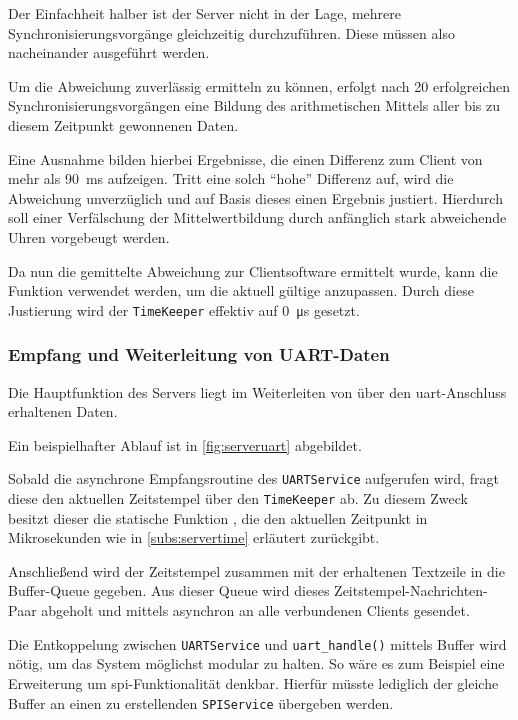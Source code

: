 Der Einfachheit halber ist der Server nicht in der Lage, mehrere
Synchronisierungsvorgänge gleichzeitig durchzuführen. Diese müssen also
nacheinander ausgeführt werden.

Um die Abweichung zuverlässig ermitteln zu können, erfolgt nach 20
erfolgreichen Synchronisierungsvorgängen eine Bildung des arithmetischen Mittels
aller bis zu diesem Zeitpunkt gewonnenen Daten. 

Eine Ausnahme bilden hierbei Ergebnisse, die einen Differenz zum Client von mehr
als \SI{90}{\ms} aufzeigen. Tritt eine solch "`hohe"' Differenz auf, wird die
Abweichung unverzüglich und auf Basis dieses einen Ergebnis justiert. Hierdurch
soll einer Verfälschung der Mittelwertbildung durch anfänglich stark
abweichende Uhren vorgebeugt werden.

Da nun die gemittelte Abweichung zur Clientsoftware ermittelt wurde, kann die
Funktion \newline{} verwendet
werden, um die aktuell gültige  anzupassen. Durch diese
Justierung wird der \texttt{TimeKeeper} effektiv auf \SI{0}{\micro\second}
gesetzt.

\subsubsection*{Empfang und Weiterleitung von UART-Daten}
Die Hauptfunktion des Servers liegt im Weiterleiten von über den
\gls{uart}-Anschluss erhaltenen Daten.

Ein beispielhafter Ablauf ist in \autoref{fig:serveruart} abgebildet.

Sobald die asynchrone Empfangsroutine des \texttt{UARTService} aufgerufen wird,
fragt diese den aktuellen Zeitstempel über den \texttt{TimeKeeper} ab. Zu
diesem Zweck besitzt dieser die statische Funktion , die den
aktuellen Zeitpunkt in Mikrosekunden wie in \autoref{subs:servertime}
erläutert zurückgibt.

Anschließend wird der Zeitstempel zusammen mit der erhaltenen Textzeile in die
Buffer-Queue gegeben. Aus dieser Queue wird dieses Zeitstempel-Nachrichten-Paar
abgeholt und mittels  asynchron an alle verbundenen Clients gesendet.

Die Entkoppelung zwischen \texttt{UARTService} und \texttt{uart\_handle()}
mittels Buffer wird nötig, um das System möglichst modular zu halten. So wäre es
zum Beispiel eine Erweiterung um \gls{spi}-Funktionalität denkbar. Hierfür müsste
lediglich der gleiche Buffer an einen zu erstellenden \texttt{SPIService}
übergeben werden.

